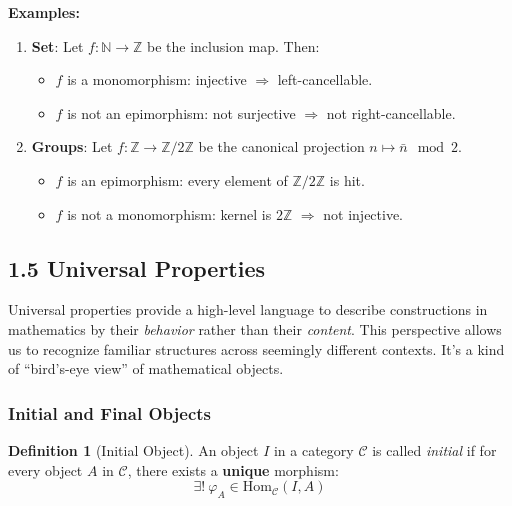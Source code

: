 \documentclass[10pt]{article}
\theoremstyle{plain}
\theoremstyle{definition}
\newtheorem{definition}{Definition}[section]
\begin{document}
  \vspace{1em}
  \textbf{Examples:}
  \begin{enumerate}
  	\item \textbf{Set}: Let $f: \mathbb{N} \to \mathbb{Z}$ be the inclusion map. Then:
  	\begin{itemize}
  		\item $f$ is a monomorphism: injective $\Rightarrow$ left-cancellable.
  		\item $f$ is not an epimorphism: not surjective $\Rightarrow$ not right-cancellable.
  	\end{itemize}
  	
  	\item \textbf{Groups}: Let $f: \mathbb{Z} \to \mathbb{Z}/2\mathbb{Z}$ be the canonical projection $n \mapsto \bar{n} \mod 2$.
  	\begin{itemize}
  		\item $f$ is an epimorphism: every element of $\mathbb{Z}/2\mathbb{Z}$ is hit.
  		\item $f$ is not a monomorphism: kernel is $2\mathbb{Z}$ $\Rightarrow$ not injective.
  	\end{itemize}
  \end{enumerate}
  
  \subsection*{1.5 Universal Properties}
  
  Universal properties provide a high-level language to describe constructions in mathematics by their \emph{behavior} rather than their \emph{content}. This perspective allows us to recognize familiar structures across seemingly different contexts. It's a kind of ``bird's-eye view'' of mathematical objects.
  
  \subsubsection*{Initial and Final Objects}
  
  \begin{definition}[Initial Object]
  	An object $I$ in a category $\mathcal{C}$ is called \emph{initial} if for every object $A$ in $\mathcal{C}$, there exists a \textbf{unique} morphism:
  	\[
  	\exists! \ \varphi_A \in \mathrm{Hom}_{\mathcal{C}}(I, A)
  	\]
  \end{definition}
  
\end{document}
